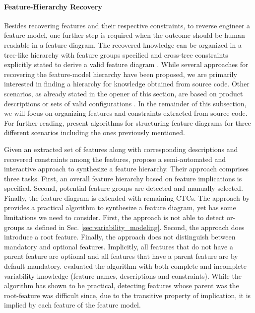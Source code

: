 \paragraph{Feature-Hierarchy Recovery} \label{sec:feature_hierarchy}
Besides recovering features and their respective constraints, to reverse
engineer a feature model, one further step is required when the outcome should
be human readable in a feature diagram. The recovered knowledge can be
organized in a tree-like hierarchy with feature groups specified and cross-tree
constraints explicitly stated to derive a valid feature diagram
\citep{kang_feature-oriented_1990}.
While several approaches for recovering the feature-model hierarchy have been
proposed, we are primarily interested in finding a hierarchy for knowledge
obtained from source code. Other scenarios, as already stated in the opener of
this section, are based on product descriptions or sets of valid configurations
\citep{aleti_software_2013,bakar_feature_2015}. In the remainder of this
subsection, we will focus on organizing features and constraints extracted from
source code. For further reading, \cite{andersen_efficient_2012} present algorithms for structuring feature diagrams for three different scenarios including the ones previously mentioned.

Given an extracted set of features along with corresponding descriptions and
recovered constraints among the features, \cite{she_reverse_2011} propose a
semi-automated and interactive approach to synthesize a feature hierarchy.
Their approach comprises three tasks. First, an overall feature hierarchy based
on feature implications is specified. Second, potential feature groups are
detected and manually selected. Finally, the feature diagram is extended with
remaining CTCs. 
The approach by \cite{she_reverse_2011} provides a practical algorithm to synthesize a
feature diagram, yet has some limitations we need to consider. First, the
approach is not able to detect or-groups as defined in Sec. \ref{sec:variability_modeling}.
Second, the approach does introduce a root feature. Finally, the approach does not
distinguish between mandatory and optional features. Implicitly, all features
that do not have a parent feature are optional and all features that have a
parent feature are by default mandatory. \cite{she_reverse_2011} evaluated the
algorithm with both complete and incomplete variability knowledge (feature
names, descriptions and constraints). While the algorithm has shown to be
practical, detecting features whose parent was the root-feature was difficult
since, due to the transitive property of implication, it is implied by each
feature of the feature model.\\


